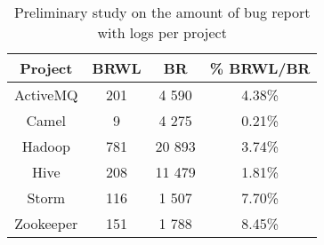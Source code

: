 \begin{table}[h!]
	\centering
	\begin{tabular}{||c c c c||} 
	 \hline
		 Project   & BRWL       & BR 	   & \% BRWL/BR \\ [0.5ex] 
		 \hline\hline
		 ActiveMQ  & 201        & 4 590    & 4.38\% \\
		 Camel     & 9 		    & 4 275	   & 0.21\% \\
		 Hadoop    & 781 	    & 20 893   & 3.74\% \\ 
		 Hive 	   & 208 	    & 11 479   & 1.81\% \\
		 Storm 	   & 116	    & 1 507     & 7.70\% \\
		 Zookeeper & 151        & 1 788     & 8.45\% \\ [1ex]
	 \hline
	\end{tabular}
	\caption{Preliminary study on the amount of bug report with logs per project}
\label{table:1}
\end{table}